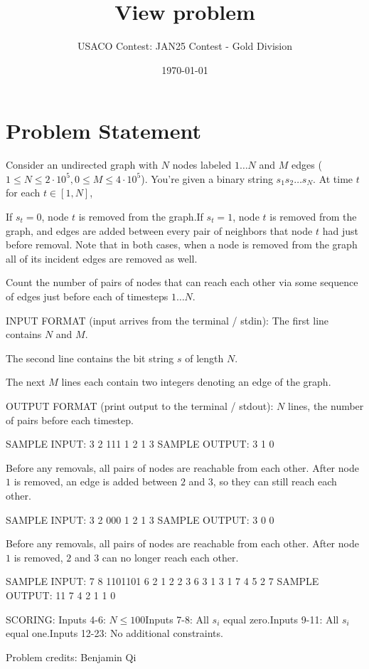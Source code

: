 \documentclass[12pt]{article}
\title{View problem}
\author{USACO Contest: JAN25 Contest - Gold Division}
\date{\today}
\begin{document}
\maketitle

\section*{Problem Statement}


Consider an undirected graph with $N$ nodes labeled $1\dots N$ and $M$ edges
($1\le N\le 2\cdot 10^5, 0\le M\le 4\cdot 10^5$). You're given a binary string
$s_1s_2\dots s_N$. At time $t$ for each $t\in [1,N]$, 

If $s_t=0$, node $t$ is removed from the graph.If $s_t=1$, node $t$ is removed from the graph, and edges are added between
every pair of neighbors that node $t$ had just before removal.
Note that in both cases, when a node is removed from the graph all of its
incident edges are removed as well.

Count the number of pairs of nodes that can reach each other via some sequence
of edges just before each of timesteps $1\ldots N$.

INPUT FORMAT (input arrives from the terminal / stdin):
The first line contains $N$ and $M$.

The second line contains the bit string $s$ of length $N$.

The next $M$ lines each contain two integers denoting an edge of the graph.

OUTPUT FORMAT (print output to the terminal / stdout):
$N$ lines, the number of pairs before each timestep.

SAMPLE INPUT:
3 2
111
1 2
1 3
SAMPLE OUTPUT: 
3
1
0

Before any removals, all pairs of nodes are reachable from each other. After
node $1$ is removed, an edge is added between $2$ and $3$, so they can still
reach each other.

SAMPLE INPUT:
3 2
000
1 2
1 3
SAMPLE OUTPUT: 
3
0
0

Before any removals, all pairs of nodes are reachable from each other. After
node $1$ is removed, $2$ and $3$ can no longer reach each other.

SAMPLE INPUT:
7 8
1101101
6 2
1 2
2 3
6 3
1 3
1 7
4 5
2 7
SAMPLE OUTPUT: 
11
7
4
2
1
1
0

SCORING:
Inputs 4-6: $N\le 100$Inputs 7-8: All $s_i$ equal zero.Inputs 9-11: All $s_i$ equal one.Inputs 12-23: No additional
constraints.


Problem credits: Benjamin Qi
\end{document}
